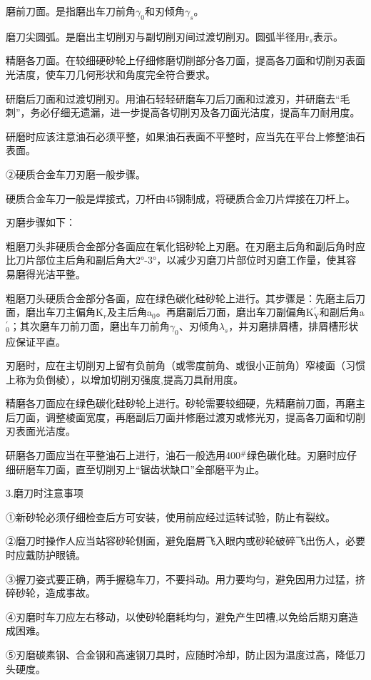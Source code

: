 \documentclass{ctexbook}
\begin{document}
磨前刀面。是指磨出车刀前角$\gamma_{0}$和刃倾角$\gamma_{s}$。

磨刀尖圆弧。是磨出主切削刃与副切削刃间过渡切削刃。圆弧半径用r$_{s}$表示。

精磨各刀面。在较细硬砂轮上仔细修磨切削部分各刀面，提高各刀面和切削刃表面光洁度，使车刀几何形状和角度完全符合要求。

研磨后刀面和过渡切削刃。用油石轻轻研磨车刀后刀面和过渡刃，并研磨去“毛刺”，务必仔细无遗漏，进一步提高各切削刃及各刀面光洁度，提高车刀耐用度。

研磨时应该注意油石必须平整，如果油石表面不平整时，应当先在平台上修整油石表面。

②硬质合金车刀刃磨一般步骤。

硬质合金车刀一般是焊接式，刀杆由45钢制成，将硬质合金刀片焊接在刀杆上。

刃磨步骤如下：

粗磨刀头非硬质合金部分各面应在氧化铝砂轮上刃磨。在刃磨主后角和副后角时应比刀片部位主后角和副后角大2°-3°，以减少刃磨刀片部位时刃磨工作量，使其容易磨得光洁平整。

粗磨刀头硬质合金部分各面，应在绿色碳化硅砂轮上进行。其步骤是：先磨主后刀面，磨出车刀主偏角K$_{r}$及主后角a$_{0}$。再磨副后刀面，磨出车刀副偏角K$^{\prime}_{\text{Y}}$和副后角a$^{\prime}_{0}$；其次磨车刀前刀面，磨出车刀前角$\gamma_{0}$、刃倾角$\lambda_{s}$，并刃磨排屑槽，排屑槽形状应保证平直。

刃磨时，应在主切削刃上留有负前角（或零度前角、或很小正前角）窄棱面（习惯上称为负倒棱），以增加切削刃强度,提高刀具耐用度。

精磨各刀面应在绿色碳化硅砂轮上进行。砂轮需要较细硬，先精磨前刀面，再磨主后刀面，调整棱面宽度，再磨副后刀面并修磨过渡刃或修光刃，提高各刀面和切削刃表面光洁度。

研磨各刀面应当在平整油石上进行，油石一般选用400$^{\#}$绿色碳化硅。刃磨时应仔细研磨车刀面，直至切削刃上“锯齿状缺口”全部磨平为止。

3.磨刀时注意事项

①新砂轮必须仔细检查后方可安装，使用前应经过运转试验，防止有裂纹。

②磨刀时操作人应当站容砂轮侧面，避免磨屑飞入眼内或砂轮破碎飞出伤人，必要时应戴防护眼镜。

③握刀姿式要正确，两手握稳车刀，不要抖动。用力要均匀，避免因用力过猛，挤碎砂轮，造成事故。

④刃磨时车刀应左右移动，以使砂轮磨耗均匀，避免产生凹槽,以免给后期刃磨造成困难。

⑤刃磨碳素钢、合金钢和高速钢刀具时，应随时冷却，防止因为温度过高，降低刀头硬度。
\end{document}
